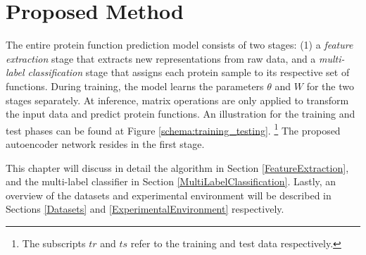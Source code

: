 %
%
%
%
%

\chapter{Proposed Method}
\label{Methodology}


\par The entire protein function prediction model consists of two stages: (1) a
\textit{feature extraction} stage that extracts new representations from
raw data, and a \textit{multi-label classification} stage that assigns each
protein sample to its respective set of functions. During training, the
model learns the parameters $\theta$ and $W$ for the two stages separately.
At inference, matrix operations are only applied to transform the input data
and predict protein functions. An illustration for the training and test phases
can be found at Figure \ref{schema:training_testing}. \footnote[2]{The subscripts
$tr$ and $ts$ refer to the training and test data respectively.} The proposed
autoencoder network resides in the first stage.

\par This chapter will discuss in detail the algorithm in Section
\ref{FeatureExtraction}, and the multi-label classifier in Section
\ref{MultiLabelClassification}. Lastly, an overview of the
datasets and experimental environment will be described in Sections
\ref{Datasets} and \ref{ExperimentalEnvironment} respectively.


